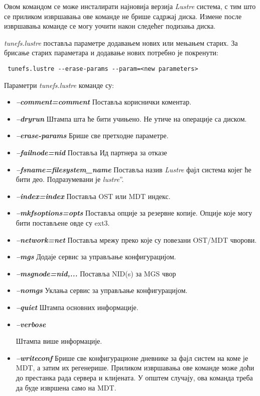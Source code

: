 Овом командом се може инсталирати најновија верзија   \textit{Lustre} система, с тим што се приликом извршавања ове команде не брише садржај диска. Измене после извршавања команде се могу уочити након следећег подизања диска.

\textit{tunefs.lustre} поставља параметре додавањем нових или мењањем старих. За брисање старих параметара и додавање нових потребно је покренути:
\begin{verbatim}
 tunefs.lustre --erase-params --param=<new parameters>
 \end{verbatim}
Параметри \textit{tunefs.lustre} команде су:
\begin{itemize}

\item \textbf{\textit{--comment=comment }}
Поставља кориснички коментар.
\item \textbf{\textit{--dryrun}} 
Штампа шта ће бити учињено. Не утиче на операције са диском.
\item \textbf{\textit{--erase-params} }
Брише све претходне параметре.
\item \textbf{\textit{--failnode=nid} }
Поставља Ид партнера за отказе
\item \textbf{\textit{--fsname=filesystem\_name }}
Поставља назив   \textit{Lustre}  фајл система којег ће бити део. Подразумевани је \zn \textit{lustre}”.
\item \textbf{\textit{--index=index }}
Поставља OST или MDT индекс.

\item \textbf{\textit{--mkfsoptions=opts }}
Поставља опције за резервне копије. Опције које могу бити постављене овде су ext3.
\item \textbf{\textit{--network=net }}
Поставља мрежу преко које су повезани OST/MDT чворови.
\item \textbf{\textit{--mgs }}
Додаје сервис за управљање конфигурацијом.
\item \textbf{\textit{--msgnode=nid,... }}
Поставља  NID(s) за MGS чвор
\item \textbf{\textit{--nomgs} }
Уклања сервис за управљање конфигурацијом.
\item \textbf{\textit{--quiet }}
Штампа основних информације.

\item \textbf{\textit{--verbose }}

Штампа више информације.
\item \textbf{\textit{--writeconf }}
Брише све конфигурационе дневнике за фајл систем на коме је MDT, а затим их регенерише. Приликом извршавања ове команде може доћи до престанка рада сервера и клијената. У општем случају, ова команда треба да буде извршена само на MDT.
\end{itemize}

